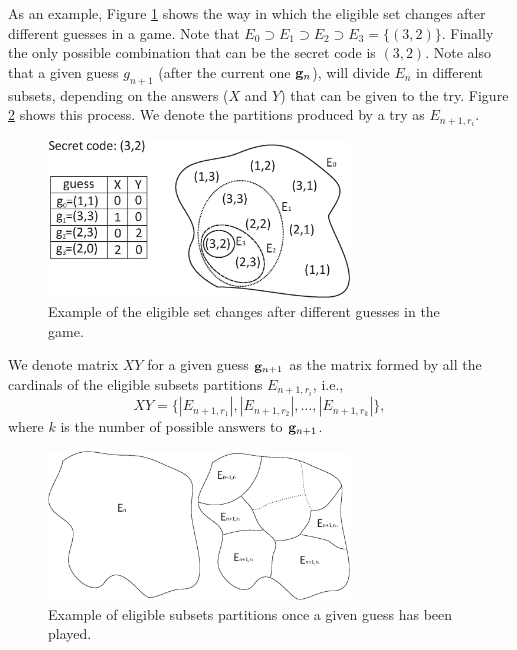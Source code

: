 As an example, Figure \ref{Particiones_En} shows the way in which the
eligible set changes after different guesses in a game. Note that $E_0
\supset E_1 \supset E_2 \supset E_3=\{(3,2)\}$. Finally the only
possible combination that can be the secret code is $(3,2)$. Note also
that a given guess $g_{n+1}$ (after the current one ${\bf g}_n$), will
divide $E_n$ in different subsets, depending on the answers ($X$ and
$Y$) that can be given to the try. Figure \ref{Partition_XY} shows this
process. We denote the partitions produced by a try as $E_{n+1,r_i}$.\\

\begin{figure}[!ht]
\begin{center}
\includegraphics[draft=false,angle=0,width=8cm]{./Particiones_En.eps}
\end{center}
\caption{\label{Particiones_En} Example of the eligible set changes after different guesses in the game.}
\end{figure}

 We denote matrix $XY$ for a given guess ${\bf g}_{n+1}$ as the matrix formed by all the cardinals of the eligible subsets partitions $E_{n+1,r_i}$, i.e., $$XY=\{|E_{n+1,r_1}|,|E_{n+1,r_2}|, \ldots, |E_{n+1,r_k}|\},$$ where $k$ is the number of possible answers to ${\bf g}_{n+1}$.\\

\begin{figure}[!ht]
\begin{center}
\includegraphics[draft=false,angle=0,width=8cm]{./Particion_XY.eps}
\end{center}
\caption{\label{Partition_XY} Example of eligible subsets partitions once a given guess has been played.}
\end{figure}

